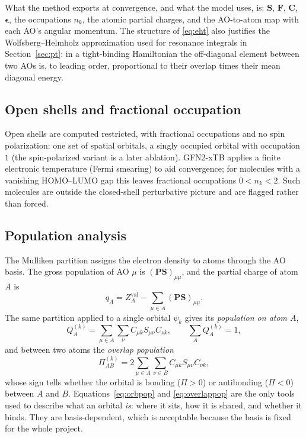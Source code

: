 \documentclass[11pt,a4paper]{article}
\newcommand{\vb}[1]{\bm{#1}}
\begin{document}
What the method exports at convergence, and what the model uses, is: $\vb{S}$, $\vb{F}$, $\vb{C}$, $\vb{\epsilon}$, the occupations $n_k$, the atomic partial charges, and the AO-to-atom map with each AO's angular momentum. The structure of \eqref{eq:eht} also justifies the Wolfsberg--Helmholz approximation used for resonance integrals in Section~\ref{sec:pt}: in a tight-binding Hamiltonian the off-diagonal element between two AOs is, to leading order, proportional to their overlap times their mean diagonal energy.

\subsection{Open shells and fractional occupation}
Open shells are computed restricted, with fractional occupations and no spin polarization: one set of spatial orbitals, a singly occupied orbital with occupation $1$ (the spin-polarized variant is a later ablation). GFN2-xTB applies a finite electronic temperature (Fermi smearing) to aid convergence; for molecules with a vanishing HOMO--LUMO gap this leaves fractional occupations $0<n_k<2$. Such molecules are outside the closed-shell perturbative picture and are flagged rather than forced.

\subsection{Population analysis}
\label{sec:mulliken}
The Mulliken partition assigns the electron density to atoms through the AO basis. The gross population of AO $\mu$ is $(\vb{P}\vb{S})_{\mu\mu}$, and the partial charge of atom $A$ is
\begin{equation}
q_A=Z^{\mathrm{val}}_A-\sum_{\mu\in A}(\vb{P}\vb{S})_{\mu\mu}.
\end{equation}
The same partition applied to a single orbital $\psi_k$ gives its \emph{population on atom $A$},
\begin{equation}
Q^{(k)}_A=\sum_{\mu\in A}\sum_\nu C_{\mu k}S_{\mu\nu}C_{\nu k},\qquad \sum_A Q^{(k)}_A=1,
\label{eq:orbpop}
\end{equation}
and between two atoms the \emph{overlap population}
\begin{equation}
\Pi^{(k)}_{AB}=2\sum_{\mu\in A}\sum_{\nu\in B}C_{\mu k}S_{\mu\nu}C_{\nu k},
\label{eq:overlappop}
\end{equation}
whose sign tells whether the orbital is bonding ($\Pi>0$) or antibonding ($\Pi<0$) between $A$ and $B$. Equations~\eqref{eq:orbpop} and \eqref{eq:overlappop} are the only tools used to describe what an orbital \emph{is}: where it sits, how it is shared, and whether it binds. They are basis-dependent, which is acceptable because the basis is fixed for the whole project.
\end{document}
